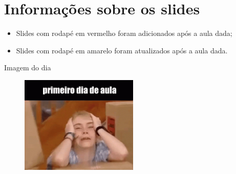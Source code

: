 \documentclass{beamer}
\begin{document}
\section{Informações sobre os slides}

\begin{frame}
      
      \begin{itemize}
            \item Slides com rodapé em vermelho foram adicionados após a aula dada;
            \item Slides com rodapé em amarelo foram atualizados  após a aula dada.
      \end{itemize}
\end{frame}

\begin{frame}[fragile]{Imagem do dia}

        \begin{figure}[H]
            \centerline{\includegraphics[width=0.5\textwidth]{assets/imagem-do-dia/primeiro-dia-aula.jpg}}
            
        \end{figure}
\end{frame}


\footlinecolor{}

\backmatter
\end{document}
